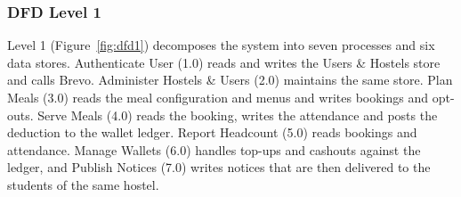 \documentclass[11pt,a4paper]{article}
\begin{document}
\subsubsection{DFD Level 1}

Level 1 (Figure~\ref{fig:dfd1}) decomposes the system into seven processes and
six data stores. Authenticate User (1.0) reads and writes the Users \& Hostels
store and calls Brevo. Administer Hostels \& Users (2.0) maintains the same
store. Plan Meals (3.0) reads the meal configuration and menus and writes
bookings and opt-outs. Serve Meals (4.0) reads the booking, writes the
attendance and posts the deduction to the wallet ledger. Report Headcount (5.0)
reads bookings and attendance. Manage Wallets (6.0) handles top-ups and
cashouts against the ledger, and Publish Notices (7.0) writes notices that are
then delivered to the students of the same hostel.
\end{document}
